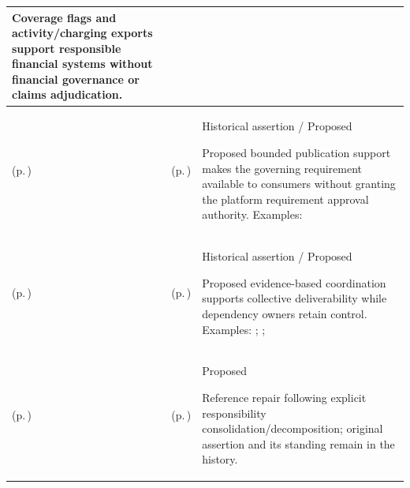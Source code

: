 \begin{longtable}{|>{\raggedright\arraybackslash}p{0.27\TableWidth}|>{\raggedright\arraybackslash}p{0.27\TableWidth}|>{\raggedright\arraybackslash}p{0.46\TableWidth}|}
Coverage flags and activity/charging exports support responsible financial systems without financial governance or claims adjudication.\\\hline
\nameref{cap:bc-health-service-governance} (p.\,\pageref{cap:bc-health-service-governance}) & \nameref{cap:bec-governance-requirement-publication-support} (p.\,\pageref{cap:bec-governance-requirement-publication-support}) & Historical assertion / Proposed

Proposed bounded publication support makes the governing requirement available to consumers without granting the platform requirement approval authority. Examples: \nameref{feature:governance-requirement-version-publication}\\\hline
\nameref{cap:bc-health-service-operational-readiness} (p.\,\pageref{cap:bc-health-service-operational-readiness}) & \nameref{cap:bec-service-offering-readiness-coordination} (p.\,\pageref{cap:bec-service-offering-readiness-coordination}) & Historical assertion / Proposed

Proposed evidence-based coordination supports collective deliverability while dependency owners retain control. Examples: \nameref{feature:service-readiness-dependency-assessment}; \nameref{function:assess-service-offering-readiness}; \nameref{service:service-offering-readiness-query}\\\hline
\nameref{cap:bc-clinical-technology-management} (p.\,\pageref{cap:bc-clinical-technology-management}) & \nameref{cap:bec-reviewed-device-utilisation-administration} (p.\,\pageref{cap:bec-reviewed-device-utilisation-administration}) & Proposed

Reference repair following explicit responsibility consolidation/decomposition; original assertion and its standing remain in the history.\\\hline
\end{longtable}\endgroup
